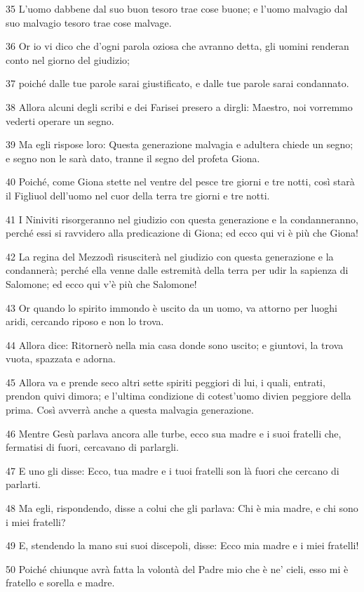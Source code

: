 \par 35 L'uomo dabbene dal suo buon tesoro trae cose buone; e l'uomo malvagio dal suo malvagio tesoro trae cose malvage.
\par 36 Or io vi dico che d'ogni parola oziosa che avranno detta, gli uomini renderan conto nel giorno del giudizio;
\par 37 poiché dalle tue parole sarai giustificato, e dalle tue parole sarai condannato.
\par 38 Allora alcuni degli scribi e dei Farisei presero a dirgli: Maestro, noi vorremmo vederti operare un segno.
\par 39 Ma egli rispose loro: Questa generazione malvagia e adultera chiede un segno; e segno non le sarà dato, tranne il segno del profeta Giona.
\par 40 Poiché, come Giona stette nel ventre del pesce tre giorni e tre notti, così starà il Figliuol dell'uomo nel cuor della terra tre giorni e tre notti.
\par 41 I Niniviti risorgeranno nel giudizio con questa generazione e la condanneranno, perché essi si ravvidero alla predicazione di Giona; ed ecco qui vi è più che Giona!
\par 42 La regina del Mezzodì risusciterà nel giudizio con questa generazione e la condannerà; perché ella venne dalle estremità della terra per udir la sapienza di Salomone; ed ecco qui v'è più che Salomone!
\par 43 Or quando lo spirito immondo è uscito da un uomo, va attorno per luoghi aridi, cercando riposo e non lo trova.
\par 44 Allora dice: Ritornerò nella mia casa donde sono uscito; e giuntovi, la trova vuota, spazzata e adorna.
\par 45 Allora va e prende seco altri sette spiriti peggiori di lui, i quali, entrati, prendon quivi dimora; e l'ultima condizione di cotest'uomo divien peggiore della prima. Così avverrà anche a questa malvagia generazione.
\par 46 Mentre Gesù parlava ancora alle turbe, ecco sua madre e i suoi fratelli che, fermatisi di fuori, cercavano di parlargli.
\par 47 E uno gli disse: Ecco, tua madre e i tuoi fratelli son là fuori che cercano di parlarti.
\par 48 Ma egli, rispondendo, disse a colui che gli parlava: Chi è mia madre, e chi sono i miei fratelli?
\par 49 E, stendendo la mano sui suoi discepoli, disse: Ecco mia madre e i miei fratelli!
\par 50 Poiché chiunque avrà fatta la volontà del Padre mio che è ne' cieli, esso mi è fratello e sorella e madre.

